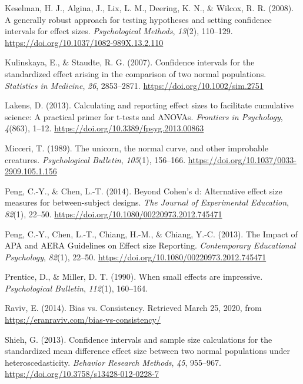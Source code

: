 \documentclass[
  english,
  man,floatsintext]{apa6}
\begin{document}
\leavevmode\hypertarget{ref-Keselman_et_al_2008}{}%
Keselman, H. J., Algina, J., Lix, L. M., Deering, K. N., \& Wilcox, R. R. (2008). A generally robust approach for testing hypotheses and setting confidence intervals for effect sizes. \emph{Psychological Methods}, \emph{13}(2), 110--129. \url{https://doi.org/10.1037/1082-989X.13.2.110}

\leavevmode\hypertarget{ref-Kulinskaya_Staudte_2007}{}%
Kulinskaya, E., \& Staudte, R. G. (2007). Confidence intervals for the standardized effect arising in the comparison of two normal populations. \emph{Statistics in Medicine}, \emph{26}, 2853--2871. \url{https://doi.org/10.1002/sim.2751}

\leavevmode\hypertarget{ref-Lakens_2013}{}%
Lakens, D. (2013). Calculating and reporting effect sizes to facilitate cumulative science: A practical primer for t-tests and ANOVAs. \emph{Frontiers in Psychology}, \emph{4}(863), 1--12. \url{https://doi.org/10.3389/fpsyg.2013.00863}

\leavevmode\hypertarget{ref-Micceri_1989}{}%
Micceri, T. (1989). The unicorn, the normal curve, and other improbable creatures. \emph{Psychological Bulletin}, \emph{105}(1), 156--166. \url{https://doi.org/10.1037/0033-2909.105.1.156}

\leavevmode\hypertarget{ref-Peng_and_Chen_2014}{}%
Peng, C.-Y., \& Chen, L.-T. (2014). Beyond Cohen's d: Alternative effect size measures for between-subject designs. \emph{The Journal of Experimental Education}, \emph{82}(1), 22--50. \url{https://doi.org/10.1080/00220973.2012.745471}

\leavevmode\hypertarget{ref-Peng_et_al_2013}{}%
Peng, C.-Y., Chen, L.-T., Chiang, H.-M., \& Chiang, Y.-C. (2013). The Impact of APA and AERA Guidelines on Effect size Reporting. \emph{Contemporary Educational Psychology}, \emph{82}(1), 22--50. \url{https://doi.org/10.1080/00220973.2012.745471}

\leavevmode\hypertarget{ref-Prentice_Miller_1992}{}%
Prentice, D., \& Miller, D. T. (1990). When small effects are impressive. \emph{Psychological Bulletin}, \emph{112}(1), 160--164.

\leavevmode\hypertarget{ref-Raviv}{}%
Raviv, E. (2014). Bias vs. Consistency. Retrieved March 25, 2020, from \url{https://eranraviv.com/bias-vs-consistency/}

\leavevmode\hypertarget{ref-Shieh_2013}{}%
Shieh, G. (2013). Confidence intervals and sample size calculations for the standardized mean difference effect size between two normal populations under heteroscedasticity. \emph{Behavior Research Methods}, \emph{45}, 955--967. \url{https://doi.org/10.3758/s13428-012-0228-7}
\end{document}
